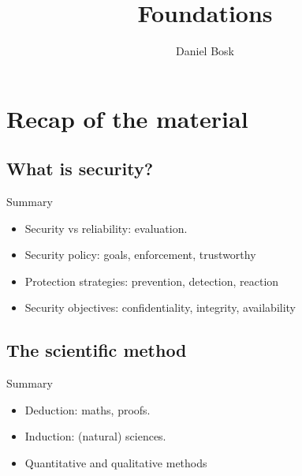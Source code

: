 \title{%
  Foundations
}
\author{Daniel Bosk}


\mode*

\section{Recap of the material}

\subsection{What is security?}

\begin{frame}
  \begin{block}{Summary}
    \begin{itemize}
      \item Security vs reliability: evaluation.

        \pause

      \item Security policy: goals, enforcement, trustworthy
        
        \pause

      \item Protection strategies: prevention, detection, reaction

        \pause

      \item Security objectives: confidentiality, integrity, availability
    \end{itemize}
  \end{block}
\end{frame}

\subsection{The scientific method}

\begin{frame}
  \begin{block}{Summary}
    \begin{itemize}
      \item Deduction: maths, proofs.
      \item Induction: (natural) sciences.
      \item Quantitative and qualitative methods
    \end{itemize}
  \end{block}
\end{frame}

